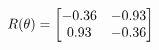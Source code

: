 \documentclass[preview]{standalone}
\begin{document}
\begin{align*}
\special{dvisvgm:raw <g id='unique000'>}R(\theta) = \begin{bmatrix}-0.36 & -0.93\\0.93 & -0.36\end{bmatrix}\special{dvisvgm:raw </g>}
\end{align*}
\end{document}

